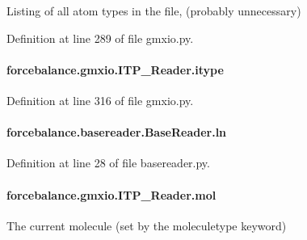 Listing of all atom types in the file, (probably unnecessary) 



Definition at line 289 of file gmxio.\-py.

\hypertarget{classforcebalance_1_1gmxio_1_1ITP__Reader_a1809bf22503b8647f48ea37c9f6f4cee}{
\paragraph[{itype}]{\setlength{\rightskip}{0pt plus 5cm}forcebalance.\-gmxio.\-I\-T\-P\-\_\-\-Reader.\-itype}}\label{classforcebalance_1_1gmxio_1_1ITP__Reader_a1809bf22503b8647f48ea37c9f6f4cee}


Definition at line 316 of file gmxio.\-py.

\hypertarget{classforcebalance_1_1basereader_1_1BaseReader_ab04436f3968d9bd6ec09238ee6537ec6}{
\paragraph[{ln}]{\setlength{\rightskip}{0pt plus 5cm}forcebalance.\-basereader.\-Base\-Reader.\-ln\hspace{0.3cm}{\ttfamily [inherited]}}}\label{classforcebalance_1_1basereader_1_1BaseReader_ab04436f3968d9bd6ec09238ee6537ec6}


Definition at line 28 of file basereader.\-py.

\hypertarget{classforcebalance_1_1gmxio_1_1ITP__Reader_a8d70d960437fa51e58954d908fdd297d}{
\paragraph[{mol}]{\setlength{\rightskip}{0pt plus 5cm}forcebalance.\-gmxio.\-I\-T\-P\-\_\-\-Reader.\-mol}}\label{classforcebalance_1_1gmxio_1_1ITP__Reader_a8d70d960437fa51e58954d908fdd297d}


The current molecule (set by the moleculetype keyword) 



